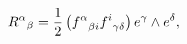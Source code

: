 \begin{equation}{R^\alpha}_\beta ={1\over 2} 
\left({f^\alpha}_{\beta i}{f^i}_{\gamma\delta}
\right)e^\gamma\wedge e^\delta,
\label{curvature}
\end{equation}

